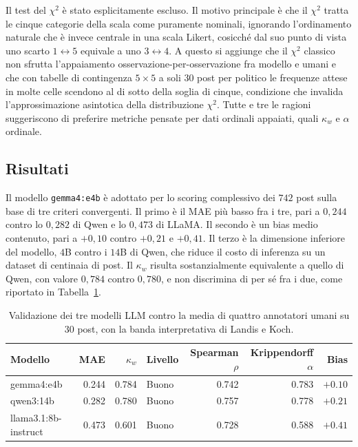 \documentclass[11pt, a4paper]{article}
\begin{document}
Il test del $\chi^2$ \`e stato esplicitamente escluso. Il motivo
principale \`e che il $\chi^2$ tratta le cinque categorie della scala
come puramente nominali, ignorando l'ordinamento naturale che \`e
invece centrale in una scala Likert, cosicch\'e dal suo punto di vista
uno scarto $1\!\leftrightarrow\!5$ equivale a uno
$3\!\leftrightarrow\!4$. A questo si aggiunge che il $\chi^2$ classico
non sfrutta l'appaiamento osservazione-per-osservazione fra modello e
umani e che con tabelle di contingenza $5\times 5$ a soli $30$ post per
politico le frequenze attese in molte celle scendono al di sotto della
soglia di cinque, condizione che invalida l'approssimazione asintotica
della distribuzione $\chi^2$. Tutte e tre le ragioni suggeriscono di
preferire metriche pensate per dati ordinali appaiati, quali $\kappa_w$
e $\alpha$ ordinale.

\subsection{Risultati}

Il modello \texttt{gemma4:e4b} \`e adottato per lo scoring complessivo
dei $742$ post sulla base di tre criteri convergenti. Il primo \`e il
MAE pi\`u basso fra i tre, pari a $0{,}244$ contro lo $0{,}282$ di Qwen
e lo $0{,}473$ di LLaMA. Il secondo \`e un bias medio contenuto, pari a
$+0{,}10$ contro $+0{,}21$ e $+0{,}41$. Il terzo \`e la dimensione
inferiore del modello, $4$B contro i $14$B di Qwen, che riduce il
costo di inferenza su un dataset di centinaia di post. Il $\kappa_w$
risulta sostanzialmente equivalente a quello di Qwen, con valore
$0{,}784$ contro $0{,}780$, e non discrimina di per s\'e fra i due,
come riportato in Tabella~\ref{tab:val}.

\begin{table}[!htbp]
\centering
\caption{Validazione dei tre modelli LLM contro la media di quattro
annotatori umani su $30$ post, con la banda interpretativa di Landis e
Koch.}
\label{tab:val}
\small
\begin{tabular}{l r r l r r r}
\toprule
\textbf{Modello} & \textbf{MAE} & \textbf{$\kappa_w$} & \textbf{Livello} &
\textbf{Spearman $\rho$} & \textbf{Krippendorff $\alpha$} & \textbf{Bias} \\
\midrule
gemma4:e4b             & 0.244 & 0.784 & Buono     & 0.742 & 0.783 & $+0.10$ \\
qwen3:14b              & 0.282 & 0.780 & Buono     & 0.757 & 0.778 & $+0.21$ \\
llama3.1:8b-instruct   & 0.473 & 0.601 & Buono     & 0.728 & 0.588 & $+0.41$ \\
\bottomrule
\end{tabular}
\end{table}
\end{document}
